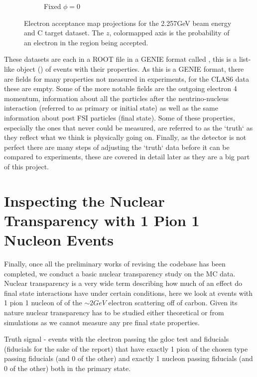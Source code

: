 \documentclass[a4paper,12pt]{article}
\newcommand{\verbb}[1]{\text{\verb|#1}}
\begin{document}
\begin{figure}[H]
\begin{subfigure}[b]{0.45\textwidth}
        \caption{Fixed $\phi = 0$}
    \end{subfigure}
    \caption{
        Electron acceptance map projections for the 2.257\si{GeV} beam energy and C target dataset.
        The $z$, colormapped axis is the probability of an electron in the region being accepted.
    }\label{fig:acc_map}
\end{figure}

These datasets are each in a ROOT file in a GENIE format called \verbb{gst}, this is a list-like object (\verbb{TTree}) of events with their properties.
As this is a GENIE format, there are fields for many properties not measured in experiments, for the CLAS6 data these are empty.
Some of the more notable fields are the outgoing electron 4 momentum, information about all the particles after the neutrino-nucleus interaction (referred to as primary or initial state) as well as the same information about post FSI particles (final state).
Some of these properties, especially the ones that never could be measured, are referred to as the `truth` as they reflect what we think is physically going on.
Finally, as the detector is not perfect there are many steps of adjusting the `truth` data before it can be compared to experiments, these are covered in detail later as they are a big part of this project.

\section{Inspecting the Nuclear Transparency with 1 Pion 1 Nucleon Events}
Finally, once all the preliminary works of revising the codebase has been completed, we conduct a basic nuclear transparency study on the MC data.
Nuclear transparency is a very wide term describing how much of an effect do final state interactions have under certain conditions, here we look at events with 1 pion 1 nucleon of of the $\sim 2\si{GeV}$ electron scattering off of carbon.
Given its nature nuclear transparency has to be studied either theoretical or from simulations as we cannot measure any pre final state properties.

Truth signal - events with the electron passing the gdoc test and fiducials (fiducials for the sake of the report) that have exactly 1 pion of the chosen type passing fiducials (and 0 of the other) and exactly 1 nucleon passing fiducials (and 0 of the other) both in the primary state.


\printbibliography
\end{document}
